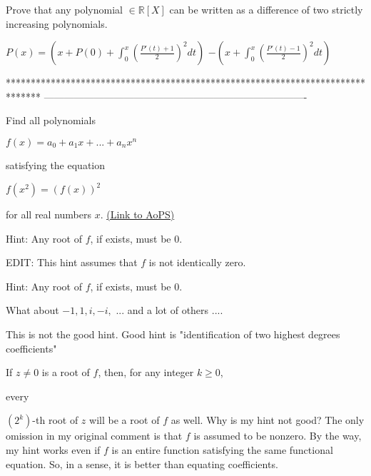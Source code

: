 \begin{solution}
	\begin{tcolorbox}Prove that any polynomial $\in \mathbb{R} [X]$ can be written as a difference of two strictly increasing polynomials.\end{tcolorbox}
$P(x)=\left(x+P(0)+\int_0^x\left(\frac{P'(t)+1}2\right)^2dt\right)$ $-\left(x+\int_0^x\left(\frac{P'(t)-1}2\right)^2dt\right)$
\end{solution}

*******************************************************************************
-------------------------------------------------------------------------------

\begin{problem}
	Find all polynomials

$f(x) = a_{0} + a_{1}x + ... + a_{n}x^{n}$

satisfying the equation 

$f(x^{2}) = (f(x))^{2}$

for all real numbers $x$.
	\flushright \href{https://artofproblemsolving.com/community/c6h571651}{(Link to AoPS)}
\end{problem}



\begin{solution}
	Hint: Any root of $f$, if exists, must be $0$.  

EDIT: This hint assumes that $f$ is not identically zero.
\end{solution}



\begin{solution}
	\begin{tcolorbox}Hint: Any root of $f$, if exists, must be $0$.\end{tcolorbox}
What about $-1, 1, i, -i,$ ... and a lot of others ....

This is not the good hint. Good hint is "identification of two highest degrees coefficients"
\end{solution}



\begin{solution}
	If $z \neq 0$ is a root of $f$, then, for any integer $k \geq 0$, \begin{bolded}every\end{bolded} $\left(2^k\right)$-th root of $z$ will be a root of $f$ as well.  Why is my hint not good?  The only omission in my original comment is that $f$ is assumed to be nonzero.  By the way, my hint works even if $f$ is an entire function satisfying the same functional equation.  So, in a sense, it is better than equating coefficients.
\end{solution}



